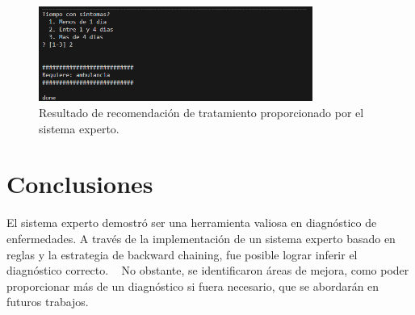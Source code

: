 \documentclass{article}
\begin{document}
\begin{figure}[h!]
  \centering
  \includegraphics[width=0.8\textwidth]{3.png}
  \caption{Resultado de recomendación de tratamiento proporcionado por el sistema experto.}
\end{figure}
\clearpage
\section{Conclusiones}

El sistema experto demostró ser una herramienta valiosa en diagnóstico de enfermedades. A través de la implementación de un sistema experto basado en reglas y la estrategia de backward chaining, fue posible lograr inferir el diagnóstico correcto.   No obstante, se identificaron áreas de mejora, como poder proporcionar más de un diagnóstico si fuera necesario, que se abordarán en futuros trabajos.
\end{document}
